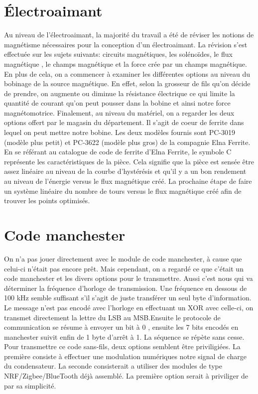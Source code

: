 \section{Électroaimant}
Au niveau de l'électroaimant, la majorité du travail a été  de réviser les notions de magnétisme nécessaires pour la conception d'un électroaimant. La révision s'est effectuée sur
les sujets suivants: circuits magnétiques, les solénoïdes, le flux magnétique , le champs magnétique et la force crée par un champs magnétique. En plus de cela, on a commencer à examiner
les différentes options au niveau du bobinage de la source magnétique. En effet, selon la grosseur de fils qu'on décide de prendre, on augmente ou diminue la résistance électrique ce qui
limite la quantité de courant qu'on peut pousser dans la bobine et ainsi notre force magnétomotrice. Finalement, au niveau du matériel, on a regarder les deux options offert par le magasin du département.
Il s'agit de coeur de ferrite dans lequel on peut mettre notre bobine. Les deux modèles fournis sont PC-3019 (modèle plus petit) et PC-3622 (modèle plus gros) de la compagnie Elna Ferrite. En se référant
au catalogue de code de ferrite d'Elna Ferrite, le symbole C représente les caractéristiques de la pièce. Cela signifie que la pièce est sensée être assez linéaire au niveau de la courbe d'hystérésis et
qu'il y a un bon rendement au niveau de l'énergie versus le flux magnétique créé. La prochaine étape de faire un système linéaire du nombre de tours versus le flux magnétique créé afin de trouver
les points optimisés.

\section{Code manchester}
On n'a pas jouer directement avec le module de code manchester, à cause que celui-ci n'était pas encore prêt. Mais cependant, on a regardé ce que c'était un code manchester
et les divers options pour le transmettre. Aussi c'est nous qui va déterminer la fréquence d'horloge de transmission. Une fréquence en dessous de 100 kHz semble suffisant s'il s'agit de juste
transférer un seul byte d'information. Le message n'est pas encodé avec l'horloge en effectuant un XOR avec celle-ci, on transmet directement la lettre du LSB au MSB.Ensuite le protocole de communication
se résume à envoyer un bit à 0 , ensuite les 7 bits encodés en manchester suivit enfin de 1 byte d'arrêt à 1. La séquence se répète sans cesse. Pour transmettre ce code sans-fils, deux options semblent
être priviligiées. La première consiste à effectuer une modulation numériques notre signal de charge du condensateur. La seconde consisterait a utiliser des modules de type NRF/Zigbee/BlueTooth déjà
assemblé. La première option serait à priviliger de par sa simplicité.
